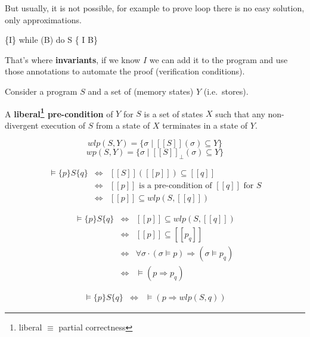 \documentclass[12pt, a4paper]{book}
\begin{document}
  But usually, it is not possible, for example to prove loop there is no easy
  solution, only approximations.

  \begin{center}
      {\{I\} \textrm{ while (B) do S } \{ I \land \lnot B\}}
  \end{center}

  That's where \textbf{invariants}, if we know $I$ we can add it to the program
  and use those annotations to automate the proof (verification conditions). \newline

  Consider a program $S$ and a set of (memory states) $Y$ (i.e.\ stores).

  A \textbf{liberal\footnote{liberal $\equiv$ partial correctness} pre-condition} of $Y$ for $S$ is a set of states $X$ such
  that any non-divergent execution of $S$ from a state of $X$ terminates in a
  state of $Y$.

  


  

  $$wlp(S,Y) = \{ \sigma \mid [[S]](\sigma) \subseteq Y \}$$
  $$wp(S,Y) = \{\sigma \mid {[[S]]}_{\perp}(\sigma) \subseteq Y \}$$

  \begin{eqnarray*}
      \vDash \{p\}S\{q\} & \iff & [[S]]([[p]]) \subseteq [[q]] \\
      & \iff & [[p]] \textrm{ is a pre-condition of } [[q]] \textrm{ for } S \\
      & \iff & [[p]] \subseteq wlp(S, [[q]])
  \end{eqnarray*}

  \begin{eqnarray*}
      \vDash \{p\}S\{q\} & \iff & [[p]] \subseteq wlp(S, [[q]]) \\
      & \iff & [[p]] \subseteq [[{p}_{q}]] \\
      & \iff & \forall\sigma \cdot (\sigma\vDash p) \Rightarrow (\sigma \vDash {p}_{q}) \\
      & \iff & \vDash (p \Rightarrow {p}_{q})
  \end{eqnarray*}

  \begin{eqnarray*}
      \vDash \{p\} S\{q\} & \iff & \vDash (p \Rightarrow wlp(S,q))
  \end{eqnarray*}
\end{document}
